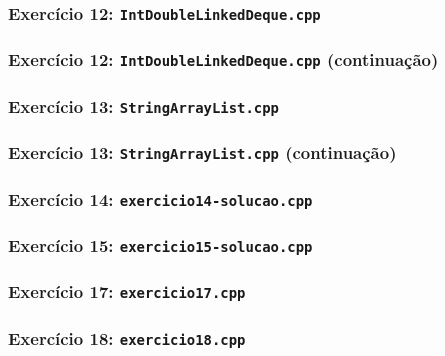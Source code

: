 \documentclass[aspectratio=169]{beamer}
\begin{document}
\begin{frame}[fragile]\frametitle{Exercício 12: \texttt{IntDoubleLinkedDeque.cpp}}
\fontsize{3pt}{5pt}\selectfont{

}
\end{frame}

\begin{frame}[fragile]\frametitle{Exercício 12: \texttt{IntDoubleLinkedDeque.cpp} (continuação)}
\fontsize{3pt}{5pt}\selectfont{

}
\end{frame}

\begin{frame}[fragile]\frametitle{Exercício 13: \texttt{StringArrayList.cpp}}
\fontsize{3pt}{5pt}\selectfont{

}
\end{frame}

\begin{frame}[fragile]\frametitle{Exercício 13: \texttt{StringArrayList.cpp} (continuação)}
\fontsize{3pt}{5pt}\selectfont{

}
\end{frame}

\begin{frame}[fragile]\frametitle{Exercício 14: \texttt{exercicio14-solucao.cpp}}
\fontsize{6pt}{6pt}\selectfont{

}
\end{frame}

\begin{frame}[fragile]\frametitle{Exercício 15: \texttt{exercicio15-solucao.cpp}}
\fontsize{6pt}{6pt}\selectfont{

}
\end{frame}

\begin{frame}[fragile]\frametitle{Exercício 17: \texttt{exercicio17.cpp}}
\fontsize{6pt}{6pt}\selectfont{

}
\end{frame}

\begin{frame}[fragile]\frametitle{Exercício 18: \texttt{exercicio18.cpp}}
\fontsize{5pt}{5pt}\selectfont{

}
\end{frame}

\end{document}
